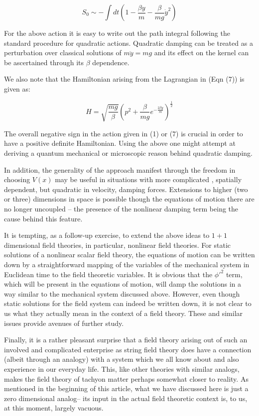 \documentclass[a4paper,prd,aps,twocolumn]{revtex4}
\begin{document}
{\begin{equation}
S_0 \sim -\int dt \left (1-\frac{\beta y}{m} -\frac{\beta}{mg}{\dot y}^2\right )
\end{equation}

For the above action it is easy to write out the path integral following
the standard procedure for quadratic actions.  
Quadratic  damping can be treated as a perturbation over classical solutions
of $m\ddot y = mg$ and its effect on the
kernel can be ascertained through its $\beta$ dependence.
 
We also note that the Hamiltonian arising from the  
Lagrangian in (Eqn (7)) is given as: 

\begin{equation}
H = \sqrt{\frac{mg}{\beta}} \left (p^2 + \frac{\beta}{mg}e^{-\frac{2\beta y}{m}}\right )^{\frac{1}{2}} 
\end{equation}

The overall negative sign in the action given in 
(1) or (7) is crucial in order to
have a positive definite Hamiltonian.
Using the above one might attempt at deriving a quantum mechanical
or microscopic reason behind  quadratic damping. 
 
In addition, the generality of the approach manifest through the
freedom in choosing $V(x)$ may be useful in situations with more complicated
, spatially dependent, but quadratic in velocity, damping forces. Extensions to
higher (two or three) dimensions in space is possible though
the equations of motion there are no longer uncoupled -- the presence
of the nonlinear damping term being the cause behind this
feature.

It is tempting, as a follow-up exercise, to extend the above ideas to $1+1$
dimensional field theories, in particular, nonlinear field theories.
For static solutions of a nonlinear scalar field theory, the 
equations of motion can be written down by a straightforward mapping
of the variables of the mechanical system in Euclidean time to the 
field theoretic variables.
It is obvious that the 
${\phi'}^2$ term, which will be present in the equations of motion,
will damp the solutions in a way similar to the mechanical system
discussed above. However, even though static solutions for the field system
can indeed be written down, it is not clear to us what they actually mean
in the context of a field theory. 
These and similar issues provide avenues of further study.

Finally, it is a rather pleasant surprise that a field theory arising out
of such an involved and complicated enterprise as string field theory
does have a connection (albeit through an analogy) with a system which
we all know about and also experience in our everyday life. This, like
other theories with similar analogs, makes the field theory of tachyon matter
perhaps somewhat closer to reality. As mentioned in the beginning of this
article, what we have discussed here is just a zero dimensional analog--
its input in the actual field theoretic context is, to us, at this moment,
largely vacuous.   

}
\end{document}
